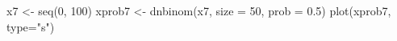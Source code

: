 \begin{Schunk}
\begin{Sinput}
 x7 <- seq(0, 100)
 xprob7 <- dnbinom(x7, size = 50, prob = 0.5)
 plot(xprob7, type="s")
\end{Sinput}
\end{Schunk}

